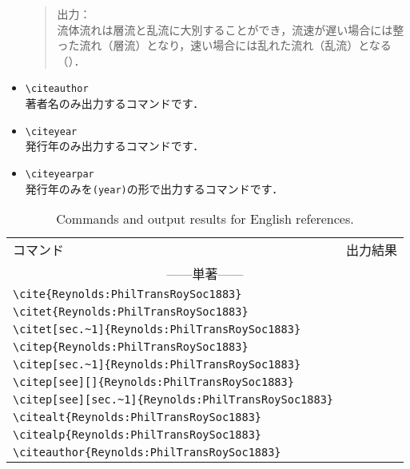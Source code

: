 \documentclass[a4paper,fleqn,uplatex,dvipdfmx]{jsarticle}
\begin{document}
\begin{itemize}
\begin{quote}
出力：\\
    流体流れは層流と乱流に大別することができ，流速が遅い場合には整った流れ（層流）となり，速い場合には乱れた流れ（乱流）となる（\citealp{Reynolds:PhilTransRoySoc1883}）．
\end{quote}
    \item \verb|\citeauthor| \\
    著者名のみ出力するコマンドです．
    \item \verb|\citeyear| \\
    発行年のみ出力するコマンドです．
    \item \verb|\citeyearpar| \\
    発行年のみを\verb|(year)|の形で出力するコマンドです．
\end{itemize}

\begin{table}[t]
    \centering
    \caption{Commands and output results for English references.}
    \label{tab:English}
    \begin{tabular}{ll}
        コマンド &出力結果 \\
        \multicolumn{2}{c}{------単著------} \\
        \verb|\cite{Reynolds:PhilTransRoySoc1883}|          &\cite{Reynolds:PhilTransRoySoc1883} \\
        \verb|\citet{Reynolds:PhilTransRoySoc1883}|         &\citet{Reynolds:PhilTransRoySoc1883} \\
        \verb|\citet[sec.~1]{Reynolds:PhilTransRoySoc1883}|         &\citet[sec.~1]{Reynolds:PhilTransRoySoc1883} \\
        \verb|\citep{Reynolds:PhilTransRoySoc1883}|         &\citep{Reynolds:PhilTransRoySoc1883} \\
        \verb|\citep[sec.~1]{Reynolds:PhilTransRoySoc1883}|         &\citep[sec.~1]{Reynolds:PhilTransRoySoc1883} \\
        \verb|\citep[see][]{Reynolds:PhilTransRoySoc1883}|         &\citep[see][]{Reynolds:PhilTransRoySoc1883} \\
        \verb|\citep[see][sec.~1]{Reynolds:PhilTransRoySoc1883}|         &\citep[see][sec.~1]{Reynolds:PhilTransRoySoc1883} \\
        \verb|\citealt{Reynolds:PhilTransRoySoc1883}|       &\citealt{Reynolds:PhilTransRoySoc1883} \\
        \verb|\citealp{Reynolds:PhilTransRoySoc1883}|       &\citealp{Reynolds:PhilTransRoySoc1883} \\
        \verb|\citeauthor{Reynolds:PhilTransRoySoc1883}|    &\citeauthor{Reynolds:PhilTransRoySoc1883} \\

\end{tabular}
\end{table}
\end{document}
